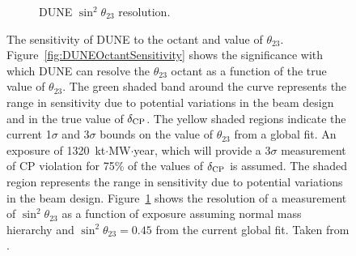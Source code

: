\begin{figure}
\begin{subfigure}[t]{0.48\linewidth}
    \caption{DUNE $\sin^2{\theta_{23}}$ resolution.}
    \label{fig:DUNETheta23Resolution}
  \end{subfigure}
  \caption[The sensitivity of DUNE to the octant and value of $\theta_{23}$.]{The sensitivity of DUNE to the octant and value of $\theta_{23}$.  Figure~\ref{fig:DUNEOctantSensitivity} shows the significance with which DUNE can resolve the $\theta_{23}$ octant as a function of the true value of $\theta_{23}$.  The green shaded band around the curve represents the range in sensitivity due to potential variations in the beam design and in the true value of $\delta_{\textnormal{CP}}$.  The yellow shaded regions indicate the current 1$\sigma$ and 3$\sigma$ bounds on the value of $\theta_{23}$ from a global fit.  An exposure of 1320~kt$\cdot$MW$\cdot$year, which will provide a 3$\sigma$ measurement of CP violation for 75\% of the values of $\delta_{\textnormal{CP}}$ is assumed.  The shaded region represents the range in sensitivity due to potential variations in the beam design.  Figure~\ref{fig:DUNETheta23Resolution} shows the resolution of a measurement of $\sin^2{\theta_{23}}$ as a function of exposure assuming normal mass hierarchy and $\sin^2{\theta_{23}}=0.45$ from the current global fit.  Taken from \cite{DUNECDR2}.}
  \label{fig:DUNETheta23}
\end{figure}

